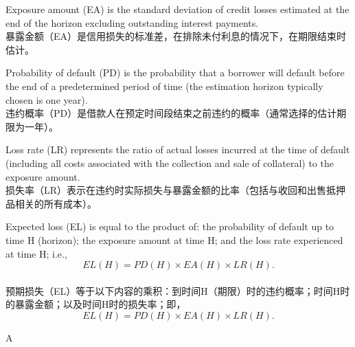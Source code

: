 \documentclass{article}
\begin{document}
    \begin{choices}
        \item Exposure amount (EA) is the standard deviation of credit losses estimated at the end of the horizon excluding outstanding interest payments.\\
        暴露金额（EA）是信用损失的标准差，在排除未付利息的情况下，在期限结束时估计。
        
        \item Probability of default (PD) is the probability that a borrower will default before the end of a predetermined period of time (the estimation horizon typically chosen is one year).\\
        违约概率（PD）是借款人在预定时间段结束之前违约的概率（通常选择的估计期限为一年）。
        
        \item Loss rate (LR) represents the ratio of actual losses incurred at the time of default (including all costs associated with the collection and sale of collateral) to the exposure amount.\\
        损失率（LR）表示在违约时实际损失与暴露金额的比率（包括与收回和出售抵押品相关的所有成本）。
        
        \item Expected loss (EL) is equal to the product of: the probability of default up to time H (horizon); the exposure amount at time H; and the loss rate experienced at time H; i.e.,
        \[
        EL(H) = PD(H) \times EA(H) \times LR(H).
        \]
        \\预期损失（EL）等于以下内容的乘积：到时间H（期限）时的违约概率；时间H时的暴露金额；以及时间H时的损失率；即，
        \[
        EL(H) = PD(H) \times EA(H) \times LR(H).
        \]
    \end{choices}
    
    \begin{correctanswer}
        A
    \end{correctanswer}
    
\end{document}
